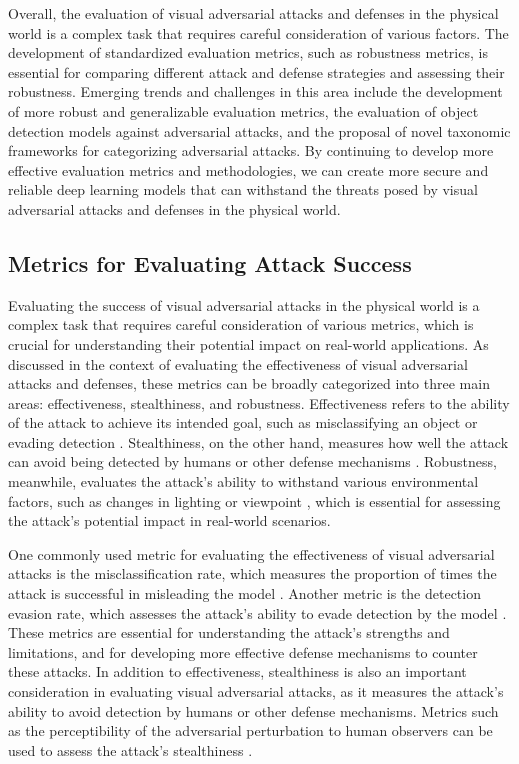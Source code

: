 \documentclass[11pt,a4paper]{article}
\begin{document}
Overall, the evaluation of visual adversarial attacks and defenses in the physical world is a complex task that requires careful consideration of various factors. The development of standardized evaluation metrics, such as robustness metrics, is essential for comparing different attack and defense strategies and assessing their robustness. Emerging trends and challenges in this area include the development of more robust and generalizable evaluation metrics, the evaluation of object detection models against adversarial attacks, and the proposal of novel taxonomic frameworks for categorizing adversarial attacks. By continuing to develop more effective evaluation metrics and methodologies, we can create more secure and reliable deep learning models that can withstand the threats posed by visual adversarial attacks and defenses in the physical world.


\subsection{Metrics for Evaluating Attack Success}


Evaluating the success of visual adversarial attacks in the physical world is a complex task that requires careful consideration of various metrics, which is crucial for understanding their potential impact on real-world applications. As discussed in the context of evaluating the effectiveness of visual adversarial attacks and defenses, these metrics can be broadly categorized into three main areas: effectiveness, stealthiness, and robustness. Effectiveness refers to the ability of the attack to achieve its intended goal, such as misclassifying an object or evading detection \cite{arxiv:1712.09665}. Stealthiness, on the other hand, measures how well the attack can avoid being detected by humans or other defense mechanisms \cite{doi:10.1109/cvprw.2019.00012}. Robustness, meanwhile, evaluates the attack's ability to withstand various environmental factors, such as changes in lighting or viewpoint \cite{arxiv:1707.08945}, which is essential for assessing the attack's potential impact in real-world scenarios.

One commonly used metric for evaluating the effectiveness of visual adversarial attacks is the misclassification rate, which measures the proportion of times the attack is successful in misleading the model \cite{doi:10.24963/ijcai.2021/694}. Another metric is the detection evasion rate, which assesses the attack's ability to evade detection by the model \cite{arxiv:1902.06705}. These metrics are essential for understanding the attack's strengths and limitations, and for developing more effective defense mechanisms to counter these attacks. In addition to effectiveness, stealthiness is also an important consideration in evaluating visual adversarial attacks, as it measures the attack's ability to avoid detection by humans or other defense mechanisms. Metrics such as the perceptibility of the adversarial perturbation to human observers can be used to assess the attack's stealthiness \cite{doi:10.1109/tpami.2022.3176760}.
\end{document}
